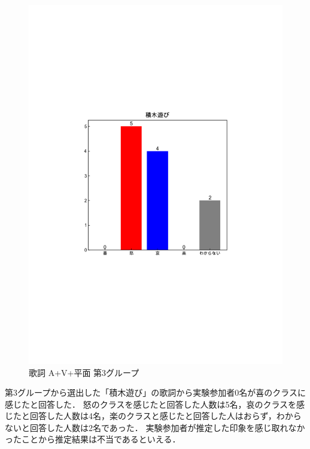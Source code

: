 \begin{figure}[H]
    \centering
    \includegraphics[width=14cm]{4315.pdf}
    \vspace{-1mm}
    \caption{歌詞 A+V+平面 第3グループ}
    \label{fig:mms}
    \vspace{5mm}
\end{figure}
第3グループから選出した「積木遊び」の歌詞から実験参加者0名が喜のクラスに感じたと回答した．
怒のクラスを感じたと回答した人数は5名，哀のクラスを感じたと回答した人数は4名，楽のクラスと感じたと回答した人はおらず，わからないと回答した人数は2名であった．
実験参加者が推定した印象を感じ取れなかったことから推定結果は不当であるといえる．
\newpage
